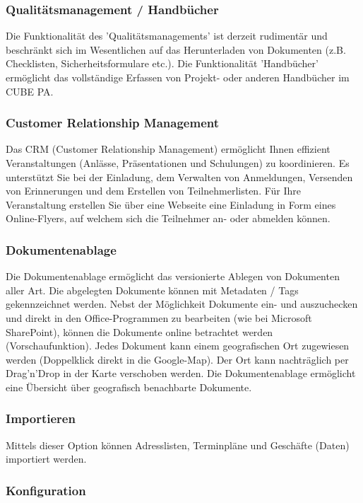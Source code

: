 \subsubsection{Qualitätsmanagement / Handbücher}

Die Funktionalität des 'Qualitätsmanagements' ist derzeit rudimentär und beschränkt sich im Wesentlichen auf das Herunterladen von Dokumenten (z.B. Checklisten, Sicherheitsformulare etc.). Die Funktionalität 'Handbücher' ermöglicht das vollständige Erfassen von Projekt- oder anderen Handbücher im CUBE PA.

\subsubsection{Customer Relationship Management}

Das CRM (Customer Relationship Management) ermöglicht Ihnen effizient Veranstaltungen (Anlässe, Präsentationen und Schulungen) zu koordinieren. Es unterstützt Sie bei der Einladung, dem Verwalten von Anmeldungen, Versenden von Erinnerungen und dem Erstellen von Teilnehmerlisten. Für Ihre Veranstaltung erstellen Sie über eine Webseite eine Einladung in Form eines Online-Flyers, auf welchem sich die Teilnehmer an- oder abmelden können.

\subsubsection{Dokumentenablage}

Die Dokumentenablage ermöglicht das versionierte Ablegen von Dokumenten aller Art. Die abgelegten Dokumente können mit Metadaten / Tags gekennzeichnet werden. Nebst der Möglichkeit Dokumente ein- und auszuchecken und direkt in den Office-Programmen zu bearbeiten (wie bei Microsoft SharePoint), können die Dokumente online betrachtet werden (Vorschaufunktion). Jedes Dokument kann einem geografischen Ort zugewiesen werden (Doppelklick direkt in die Google-Map). Der Ort kann nachträglich per Drag’n’Drop in der Karte verschoben werden. Die Dokumentenablage ermöglicht eine Übersicht über geografisch benachbarte Dokumente.

\subsubsection{Importieren}

Mittels dieser Option können Adresslisten, Terminpläne und Geschäfte (Daten) importiert werden.

\subsubsection{Konfiguration}

